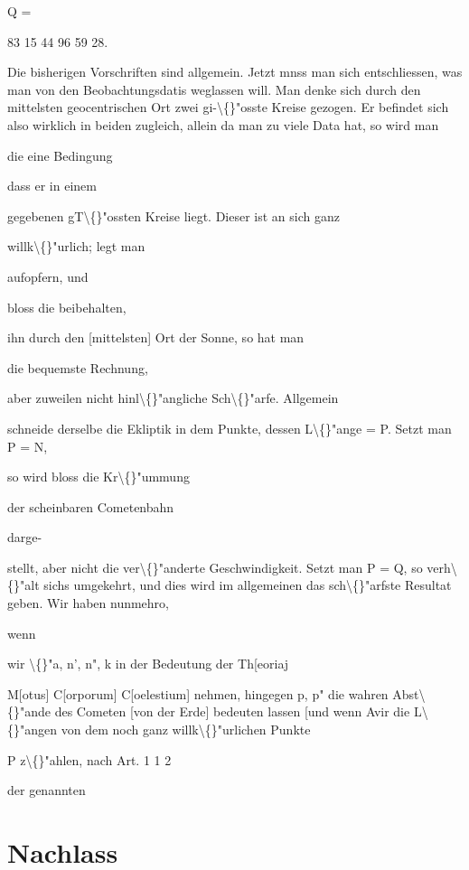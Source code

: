 \documentclass[10pt,a4paper]{article}
\begin{document}
Q =

83 15 44
96 59 28.

Die bisherigen Vorschriften sind allgemein. Jetzt mnss man sich entschliessen, was man von den Beobachtungsdatis weglassen will. Man denke
sich durch den mittelsten geocentrischen Ort zwei gi-\textbackslash\{\}"osste Kreise gezogen. Er
befindet sich also wirklich in beiden zugleich, allein da man zu viele Data
hat, so wird man

die eine Bedingung

dass er in einem

gegebenen gT\textbackslash\{\}"ossten Kreise liegt. Dieser ist an sich ganz

willk\textbackslash\{\}"urlich; legt man

aufopfern, und

bloss die beibehalten,

ihn durch den [mittelsten] Ort der Sonne, so hat man

die bequemste Rechnung,

aber zuweilen nicht hinl\textbackslash\{\}"angliche Sch\textbackslash\{\}"arfe. Allgemein

schneide derselbe die Ekliptik in dem Punkte, dessen L\textbackslash\{\}"ange = P. Setzt man
P = N,

so wird bloss die Kr\textbackslash\{\}"ummung

der scheinbaren Cometenbahn

darge-

stellt, aber nicht die ver\textbackslash\{\}"anderte Geschwindigkeit. Setzt man P = Q, so verh\textbackslash\{\}"alt sichs umgekehrt, und dies wird im allgemeinen das sch\textbackslash\{\}"arfste Resultat
geben.
Wir haben nunmehro,

wenn

wir \textbackslash\{\}"a, n', n", k in der Bedeutung der Th[eoriaj

M[otus] C[orporum] C[oelestium] nehmen, hingegen p, p" die wahren Abst\textbackslash\{\}"ande
des Cometen [von der Erde] bedeuten lassen [und wenn Avir die L\textbackslash\{\}"angen von
dem noch ganz willk\textbackslash\{\}"urlichen Punkte

P z\textbackslash\{\}"ahlen, nach Art. 1 1 2

der genannten

\newpage

\section*{Nachlass}
\end{document}
